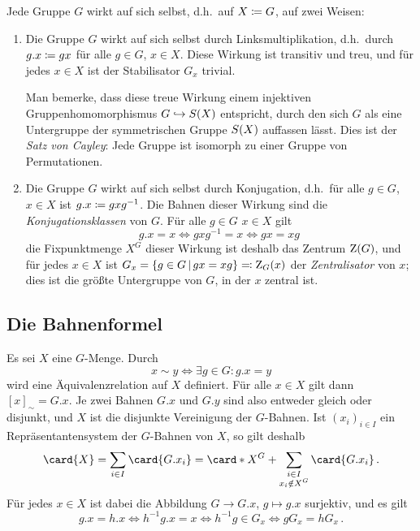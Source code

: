 \begin{example}
  Jede Gruppe $G$ wirkt auf sich selbst, d.h.\ auf $X \coloneqq G$, auf zwei Weisen:
  \begin{enumerate}
    \item
      Die Gruppe $G$ wirkt auf sich selbst durch Linksmultiplikation, d.h.\ durch $g.x \coloneqq gx$ für alle $g \in G$, $x \in X$.
      Diese Wirkung ist transitiv und treu, und für jedes $x \in X$ ist der Stabilisator $G_x$ trivial.
      
      Man bemerke, dass diese treue Wirkung einem injektiven Gruppenhomomorphismus $G \hookrightarrow S(X)$ entspricht, durch den sich $G$ als eine Untergruppe der symmetrischen Gruppe $S(X)$ auffassen lässt.
      Dies ist der \emph{Satz von Cayley}:
      Jede Gruppe ist isomorph zu einer Gruppe von Permutationen.
    \item
      Die Gruppe $G$ wirkt auf sich selbst durch Konjugation, d.h.\ für alle $g \in G$, $x \in X$ ist $g.x \coloneqq gxg^{-1}$.
      Die Bahnen dieser Wirkung sind die \emph{Konjugationsklassen} von $G$.
      Für alle $g \in G$ $x \in X$ gilt
      \[
          g.x
        = x
        \iff
          gxg^{-1}
        = x
        \iff
          gx
        = xg \;
      \]
      die Fixpunktmenge $X^G$ dieser Wirkung ist deshalb das Zentrum $\operatorname{Z}(G)$, und für jedes $x \in X$ ist $G_x = \{g \in G \suchthat gx = xg\} \eqqcolon \centralizer{G}{x}$ der \emph{Zentralisator} von $x$;
      dies ist die größte Untergruppe von $G$, in der $x$ zentral ist.
  \end{enumerate}
\end{example}



\subsection{Die Bahnenformel}

Es sei $X$ eine $G$-Menge.
Durch
\[
        x \sim y
  \iff  \exists g \in G: g.x = y
\]
wird eine Äquivalenzrelation auf $X$ definiert.
Für alle $x \in X$ gilt dann $[x]_{\sim} = G.x$.
Je zwei Bahnen $G.x$ und $G.y$ sind also entweder gleich oder disjunkt, und $X$ ist die disjunkte Vereinigung der $G$-Bahnen.
Ist $(x_i)_{i \in I}$ ein Repräsentantensystem der $G$-Bahnen von $X$, so gilt deshalb
\begin{equation}
\label{equation: orbit formula alpha}
    \card{X}
  = \sum_{i \in I} \card{G.x_i}
  = \card*{X^G} + \sum_{\substack{i \in I \\ x_i \notin X^G}} \card{G.x_i} \,.
\end{equation}
Für jedes $x \in X$ ist dabei die Abbildung $G \to G.x$, $g \mapsto g.x$ surjektiv, und es gilt
\[
        g.x = h.x
  \iff  h^{-1}g.x = x
  \iff  h^{-1} g \in G_x
  \iff  g G_x = h G_x \,.
\]

